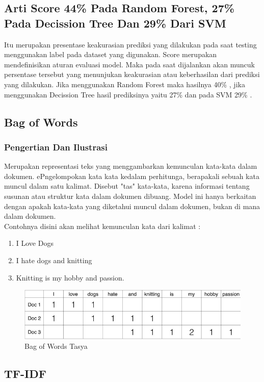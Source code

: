 \subsection{Arti Score 44\% Pada Random Forest, 27\% Pada Decission Tree Dan 29\% Dari SVM}
Itu merupakan presentase keakurasian prediksi yang dilakukan pada saat testing menggunakan label pada dataset yang digunakan. Score merupakan mendefinisikan aturan evaluasi model. Maka pada saat dijalankan akan muncuk persentase tersebut yang menunjukan keakurasian atau keberhasilan dari prediksi yang dilakukan. Jika menggunakan Random Forest maka hasilnya 40\% , jika menggunakan Decission Tree hasil prediksinya yaitu 27\% dan pada SVM 29\% .

\subsection{Bag of Words}
\subsubsection{Pengertian Dan Ilustrasi}
Merupakan representasi teks yang menggambarkan kemunculan kata-kata dalam dokumen. ePngelompokan kata kata kedalam perhitunga, berapakali sebuah kata muncul dalam satu kalimat. Disebut "tas" kata-kata, karena informasi tentang susunan atau struktur kata dalam dokumen dibuang. Model ini hanya berkaitan dengan apakah kata-kata yang diketahui muncul dalam dokumen, bukan di mana dalam dokumen.\\
Contohnya disini akan melihat kemunculan kata dari kalimat :
\begin{enumerate}
\item I Love Dogs
\item I hate dogs and knitting
\item Knitting is my hobby and passion. 
\end{enumerate}
\begin{figure}[ht]
\centering
\includegraphics[scale=0.5]{figures/chapter4tasya4.png}
\caption{Bag of Words Tasya}
\label{Contoh}
\end{figure}

\subsection{TF-IDF}
